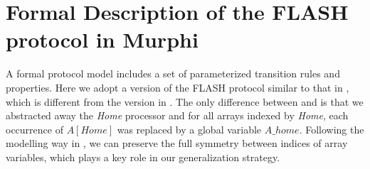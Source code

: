 \documentclass{llncs-new}
\newcommand{\forget}[1]{}
\begin{document}
\section{Formal Description of the FLASH protocol in Murphi\label{sec:formalDescription}}
A formal protocol model includes a set of parameterized transition rules and properties.  Here we adopt a version of the FLASH protocol similar to that in \cite{cubeicBeyond}, which is different from the version in \cite{Chou2004}. The only
difference between \cite{cubeicBeyond} and \cite{Chou2004}  is that we abstracted away the \emph{Home}
processor and for all arrays indexed by \emph{Home}, each occurrence
of $A[Home]$ was replaced by a global variable $A\_home$. Following the modelling way in \cite{cubeicBeyond}, we can preserve the full symmetry between indices of array variables, which plays a key role in our generalization strategy.

\forget{The difference between them lies in the modeling of behaviors of a Home node. Behaviours of the Home node is not identical to those of the other nodes while behaviors of
 a non-Home node are identical to those of the other non-Home node. In the model of work in \cite{Chou2004}, state variables of the Home node and non-Home nodes are both array-variables. This modeling has a shortage of destroying the symmetry between indices which represents identifiers for agents. This will bring trouble to identify the equivalence between formulas under symmetry relation. For instance,  the two formulas (Sta.Proc[1].CacheState = CACHE\_E \& Sta.Proc[1].CacheState = CACHE\_E) and (Sta.Proc[2].CacheState = CACHE\_E \& Sta.Proc[1].CacheState = CACHE\_E) can't be regarded to be equivalent in the original version because Home may be 1 or 2.  In \cite{LiCache16a}, we use the original unsymmetrical version shown in (a) on the next page, and too much work was needed to be done to identify whether $i$ is Home or not when   a formula containing an array variable $a[i]$ is dealt with.}
\end{document}
